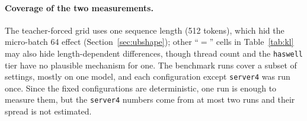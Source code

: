\paragraph{Coverage of the two measurements.}
The teacher-forced grid uses one sequence length (512 tokens), which hid the micro-batch 64
effect (Section~\ref{sec:ubshape}); other ``$=$'' cells in Table~\ref{tab:kl} may also hide
length-dependent differences, though thread count and the \texttt{haswell} tier have no
plausible mechanism for one. The benchmark runs cover a subset of settings, mostly on one model,
and each configuration except \texttt{server4} was run once. Since the fixed configurations are
deterministic, one run is enough to measure them, but the \texttt{server4} numbers come from at
most two runs and their spread is not estimated.
